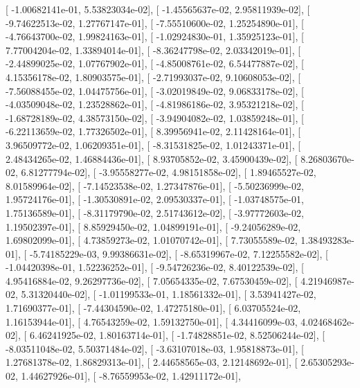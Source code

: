 \documentclass{article}
\begin{document}
       [ -1.00682141e-01,   5.53823034e-02],
       [ -1.45565637e-02,   2.95811939e-02],
       [ -9.74622513e-02,   1.27767147e-01],
       [ -7.55510600e-02,   1.25254890e-01],
       [ -4.76643700e-02,   1.99824163e-01],
       [ -1.02924830e-01,   1.35925123e-01],
       [  7.77004204e-02,   1.33894014e-01],
       [ -8.36247798e-02,   2.03342019e-01],
       [ -2.44899025e-02,   1.07767902e-01],
       [ -4.85008761e-02,   6.54477887e-02],
       [  4.15356178e-02,   1.80903575e-01],
       [ -2.71993037e-02,   9.10608053e-02],
       [ -7.56088455e-02,   1.04475756e-01],
       [ -3.02019849e-02,   9.06833178e-02],
       [ -4.03509048e-02,   1.23528862e-01],
       [ -4.81986186e-02,   3.95321218e-02],
       [ -1.68728189e-02,   4.38573150e-02],
       [ -3.94904082e-02,   1.03859248e-01],
       [ -6.22113659e-02,   1.77326502e-01],
       [  8.39956941e-02,   2.11428164e-01],
       [  3.96509772e-02,   1.06209351e-01],
       [ -8.31531825e-02,   1.01243371e-01],
       [  2.48434265e-02,   1.46884436e-01],
       [  8.93705852e-02,   3.45900439e-02],
       [  8.26803670e-02,   6.81277794e-02],
       [ -3.95558277e-02,   4.98151858e-02],
       [  1.89465527e-02,   8.01589964e-02],
       [ -7.14523538e-02,   1.27347876e-01],
       [ -5.50236999e-02,   1.95724176e-01],
       [ -1.30530891e-02,   2.09530337e-01],
       [ -1.03748575e-01,   1.75136589e-01],
       [ -8.31179790e-02,   2.51743612e-02],
       [ -3.97772603e-02,   1.19502397e-01],
       [  8.85929450e-02,   1.04899191e-01],
       [ -9.24056289e-02,   1.69802099e-01],
       [  4.73859273e-02,   1.01070742e-01],
       [  7.73055589e-02,   1.38493283e-01],
       [ -5.74185229e-03,   9.99386631e-02],
       [ -8.65319967e-02,   7.12255582e-02],
       [ -1.04420398e-01,   1.52236252e-01],
       [ -9.54726236e-02,   8.40122539e-02],
       [  4.95416884e-02,   9.26297736e-02],
       [  7.05654335e-02,   7.67530459e-02],
       [  4.21946987e-02,   5.31320440e-02],
       [ -1.01199533e-01,   1.18561332e-01],
       [  3.53941427e-02,   1.71690377e-01],
       [ -7.44304590e-02,   1.47275180e-01],
       [  6.03705524e-02,   1.16153944e-01],
       [  4.76543259e-02,   1.59132750e-01],
       [  4.34416099e-03,   4.02468462e-02],
       [  6.46241925e-02,   1.80163714e-01],
       [ -1.74828851e-02,   8.52506244e-02],
       [ -8.03511048e-02,   5.50371484e-02],
       [ -3.63107018e-03,   1.95818873e-01],
       [  1.27681378e-02,   1.86829313e-01],
       [  2.44658565e-03,   2.12148692e-01],
       [  2.65305293e-02,   1.44627926e-01],
       [ -8.76559953e-02,   1.42911172e-01],
\end{document}
